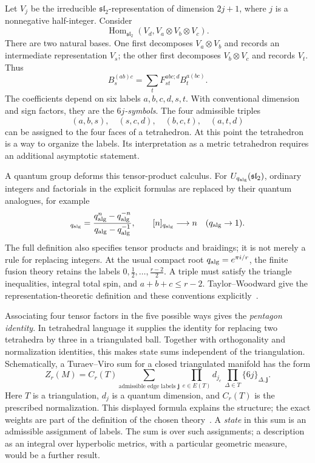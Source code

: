 \documentclass[11pt,a4paper]{article}
\numberwithin{equation}{section}
\theoremstyle{definition}
\theoremstyle{remark}
\begin{document}
Let $V_j$ be the irreducible $\mathfrak{sl}_2$-representation of dimension
$2j+1$, where $j$ is a nonnegative half-integer. Consider
\[
 \operatorname{Hom}_{\mathfrak{sl}_2}(V_d,V_a\otimes V_b\otimes V_c).
\]
There are two natural bases. One first decomposes $V_a\otimes V_b$
and records an intermediate representation $V_s$; the other first
decomposes $V_b\otimes V_c$ and records $V_t$. Thus
\begin{equation}
 B_s^{(ab)c}=\sum_t F_{st}^{abc;d}B_t^{a(bc)}.
 \label{eq:introrecoupling}
\end{equation}
The coefficients depend on six labels $a,b,c,d,s,t$. With conventional
dimension and sign factors, they are the \emph{$6j$-symbols}. The
four admissible triples
\[
 (a,b,s),\quad(s,c,d),\quad(b,c,t),\quad(a,t,d)
\]
can be assigned to the four faces of a tetrahedron. At this point the
tetrahedron is a way to organize the labels. Its interpretation as a
metric tetrahedron requires an additional asymptotic statement.

A quantum group deforms this tensor-product calculus. For
$U_{q_{\rm alg}}(\mathfrak{sl}_2)$, ordinary integers and factorials in
the explicit formulas are replaced by their quantum analogues, for example
\begin{equation}
 [n]_{q_{\rm alg}}
 =\frac{q_{\rm alg}^{n}-q_{\rm alg}^{-n}}
        {q_{\rm alg}-q_{\rm alg}^{-1}},\qquad
 [n]_{q_{\rm alg}}\longrightarrow n\quad(q_{\rm alg}\to1).
 \label{eq:introqinteger}
\end{equation}
The full definition also specifies tensor products and braidings; it
is not merely a rule for replacing integers. At the usual compact
root $q_{\rm alg}=e^{\pi i/r}$, the finite fusion theory retains the
labels $0,\frac12,\ldots,\frac{r-2}{2}$. A triple must satisfy the
triangle inequalities, integral total spin, and
$a+b+c\le r-2$. Taylor--Woodward give the representation-theoretic
definition and these conventions explicitly~\cite{TaylorWoodward}.

Associating four tensor factors in the five possible ways gives the
\emph{pentagon identity}. In tetrahedral language it supplies the
identity for replacing two tetrahedra by three in a triangulated ball.
Together with orthogonality and normalization identities, this makes
state sums independent of the triangulation. Schematically, a
Turaev--Viro sum for a closed triangulated manifold has the form
\begin{equation}
 Z_r(M)=C_r(T)\sum_{\text{admissible edge labels }\mathbf j}
       \prod_{e\in E(T)}d_{j_e}\,
       \prod_{\Delta\in T}\{6j\}_{\Delta,\mathbf j}.
 \label{eq:introstatesum}
\end{equation}
Here $T$ is a triangulation, $d_j$ is a quantum dimension, and $C_r(T)$
is the prescribed normalization. This displayed formula explains the
structure; the exact weights are part of the definition of the chosen
theory~\cite[Sections 2.2--2.3]{ChenYang}. A \emph{state} in this sum
is an admissible assignment of labels. The sum is over such assignments;
a description as an integral over hyperbolic metrics, with a particular
geometric measure, would be a further result.
\end{document}
